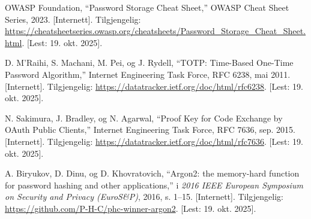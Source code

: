 \documentclass[12pt,a4paper]{article}
\begin{document}
\begin{thebibliography}{9}

OWASP Foundation, ``Password Storage Cheat Sheet,'' OWASP Cheat Sheet Series, 2023. [Internett]. Tilgjengelig: \url{https://cheatsheetseries.owasp.org/cheatsheets/Password_Storage_Cheat_Sheet.html}. [Lest: 19. okt. 2025].

D. M'Raihi, S. Machani, M. Pei, og J. Rydell, ``TOTP: Time-Based One-Time Password Algorithm,'' Internet Engineering Task Force, RFC 6238, mai 2011. [Internett]. Tilgjengelig: \url{https://datatracker.ietf.org/doc/html/rfc6238}. [Lest: 19. okt. 2025].

N. Sakimura, J. Bradley, og N. Agarwal, ``Proof Key for Code Exchange by OAuth Public Clients,'' Internet Engineering Task Force, RFC 7636, sep. 2015. [Internett]. Tilgjengelig: \url{https://datatracker.ietf.org/doc/html/rfc7636}. [Lest: 19. okt. 2025].

A. Biryukov, D. Dinu, og D. Khovratovich, ``Argon2: the memory-hard function for password hashing and other applications,'' i \textit{2016 IEEE European Symposium on Security and Privacy (EuroS\&P)}, 2016, s. 1--15. [Internett]. Tilgjengelig: \url{https://github.com/P-H-C/phc-winner-argon2}. [Lest: 19. okt. 2025].

\end{thebibliography}

\listoffigures
\end{document}
